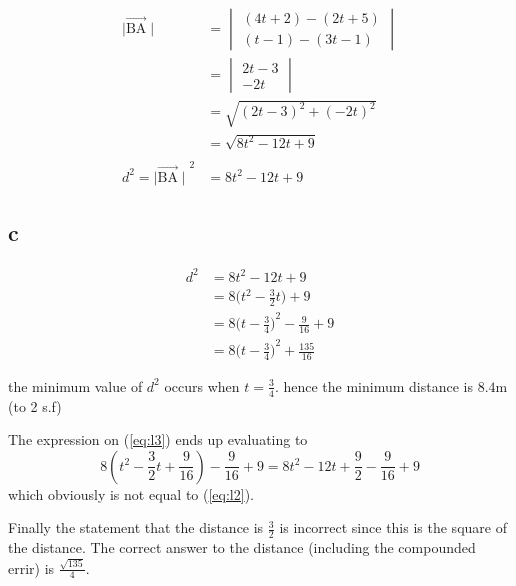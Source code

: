 \documentclass{article}
\begin{document}
\begin{align*}
	\mid\vec{\mathrm{BA}}\mid          & =
	\begin {vmatrix}
	(4t + 2) - (2t + 5)                                     \\
	( t - 1) - (3t - 1)
	\end {vmatrix}                                          \\
	                                   & =
	\begin {vmatrix}
	2t - 3                                                  \\
	-2t
	\end {vmatrix}                                          \\
	                                   & =
	\sqrt {(2t - 3)^2 + (-2t)^2}                            \\
	                                   & =
	\sqrt {8t^2 -12t + 9}                                   \\
	\\
	d^2 ={\mid\vec{\mathrm{BA}}\mid}^2 & = 8 t^2 - 12 t + 9
\end{align*}

\subsection{c}

\begin{align}
	d^2 & = 8 t^2 - 12 t + 9                       \label{eq:l1}         \\
	    & = 8\Big(t^2 - \frac 32 t\Big) + 9                \label{eq:l2} \\
	    & = 8{\Big(t - \frac 34\Big)}^2 - \frac 9 {16} + 9 \label{eq:l3} \\
	    & = 8{\Big(t - \frac 34\Big)}^2 + \frac {135} {16} \label{eq:l4}
\end{align}
\begin{center}
	\parbox{7cm}{
		the minimum value of $d^2$ occurs when $t =\frac 34$.
		hence the minimum distance is $8.4 \mathrm m$ (to 2 s.f)}
\end{center}

The expression on (\ref{eq:l3}) ends up evaluating to
$$8(t^2 - \frac 32 t + \frac 9 {16}) - \frac 9{16} + 9 = 8t^2 - 12 t + \frac 9 {2} - \frac 9{16} + 9$$
which obviously is not equal to (\ref{eq:l2}).

Finally the statement that the distance is $\frac 32$ is incorrect since this is the square of the distance. The correct answer to the distance (including the compounded errir) is $\frac {\sqrt{135}}4$.
\end{document}

